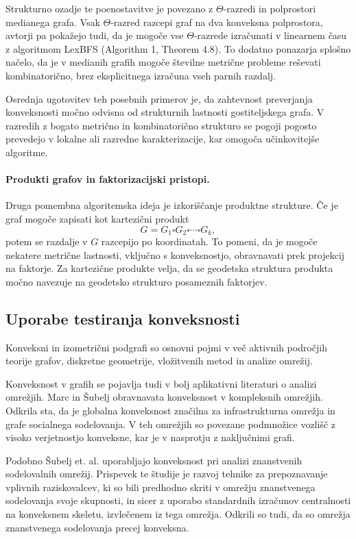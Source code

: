 \documentclass[sigconf
]{acmart}
\theoremstyle{definition}
\begin{document}
Strukturno ozadje te poenostavitve je povezano z \(\Theta\)-razredi in
polprostori medianega grafa.
Vsak \(\Theta\)-razred razcepi graf na dva
konveksna polprostora, avtorji \cite{beneteau2022medians} pa pokažejo tudi, da je mogoče vse \(\Theta\)-razrede izračunati v linearnem času z algoritmom LexBFS (Algorithm 1, Theorem 4.8).
To dodatno ponazarja splošno načelo, da je v medianih grafih mogoče številne metrične probleme reševati kombinatorično, brez eksplicitnega izračuna vseh parnih razdalj.

Osrednja ugotovitev teh posebnih primerov je, da zahtevnost preverjanja
konveksnosti  močno odvisna od strukturnih lastnosti gostiteljskega grafa.
V razredih z bogato metrično in kombinatorično strukturo se pogoji pogosto prevedejo v lokalne ali razredne karakterizacije, kar omogoča učinkovitejše algoritme.

\paragraph{Produkti grafov in faktorizacijski pristopi.}
Druga pomembna algoritemska ideja je izkoriščanje produktne strukture.
Če je graf mogoče zapisati kot kartezični produkt
\[
  G = G_1 \square G_2 \square \cdots \square G_k,
\]
potem se razdalje v \(G\) razcepijo po koordinatah.
To pomeni, da je mogoče nekatere metrične lastnosti, vključno s konveksnostjo, obravnavati prek projekcij na faktorje.
Za kartezične produkte velja, da se geodetska struktura produkta močno navezuje na geodetsko strukturo posameznih faktorjev.

\subsection{Uporabe testiranja konveksnosti}
Konveksni in izometrični podgrafi so osnovni pojmi v več aktivnih področjih teorije grafov, diskretne geometrije, vložitvenih metod in analize omrežij.

Konveksnost v grafih se pojavlja tudi v bolj aplikativni literaturi o
analizi omrežjih.
Marc in Šubelj \cite{subelj2018} obravnavata
konveksnost v kompleksnih omrežjih.
Odkrila sta, da je globalna konveksnost značilna za infrastrukturna omrežja in grafe socialnega sodelovanja.
V teh omrežjih so povezane podmnožice vozlišč z visoko verjetnostjo konveksne, kar je v nasprotju z naključnimi grafi.

Podobno Šubelj et. al. \cite{subeljetal2019} uporabljajo konveksnost pri
analizi znanstvenih sodelovalnih omrežij.
Prispevek te študije je razvoj tehnike za prepoznavanje vplivnih raziskovalcev, ki so bili predhodno skriti v omrežju znanstvenega sodelovanja svoje skupnosti, in sicer z uporabo standardnih izračunov centralnosti na konveksnem skeletu, izvlečenem iz tega omrežja.
Odkrili so tudi, da so omrežja znanstvenega sodelovanja precej konveksna.
\end{document}

